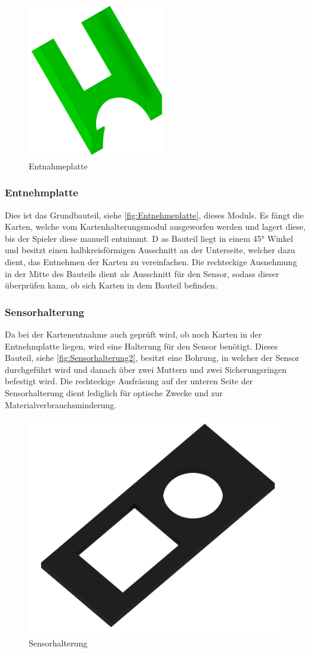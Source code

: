 \begin{figure}
    \includegraphics[width = 6cm]{fig/mech/Ausgabefach.png}
    \caption{Entnahmeplatte}
    \label{fig:Entnehmeplatte}
\end{figure}
\subsubsection{Entnehmplatte}

Dies ist das Grundbauteil, siehe \autoref{fig:Entnehmeplatte}, dieses Moduls.
Es fängt die Karten, welche vom Kartenhalterungsmodul ausgeworfen werden und lagert diese, bis
der Spieler diese manuell entnimmt. D
as Bauteil liegt in einem 45° Winkel und besitzt einen halbkreisförmigen Ausschnitt
an der Unterseite, welcher dazu dient, das Entnehmen der Karten zu vereinfachen.
Die rechteckige Ausnehmung in der Mitte des
Bauteils dient als Ausschnitt für den Sensor, sodass dieser überprüfen kann, ob sich Karten in dem Bauteil befinden.


\subsubsection{Sensorhalterung}

Da bei der Kartenentnahme auch geprüft wird, ob noch Karten in der Entnehmplatte liegen, wird eine Halterung für den
Sensor benötigt.
Dieses Bauteil, siehe \autoref{fig:Sensorhalterung2}, besitzt eine Bohrung, in welcher der Sensor durchgeführt wird und danach über zwei Muttern und
zwei Sicherungsringen befestigt wird.
Die rechteckige Ausfräsung auf der unteren Seite der Sensorhalterung dient lediglich für optische Zwecke und zur Materialverbrauchsminderung.

\begin{figure}[H]
    \centering
    \includegraphics[width=8 cm]{fig/mech/SensorStuetze.png}
    \caption{Sensorhalterung}
    \label{fig:Sensorhalterung2}
\end{figure}

